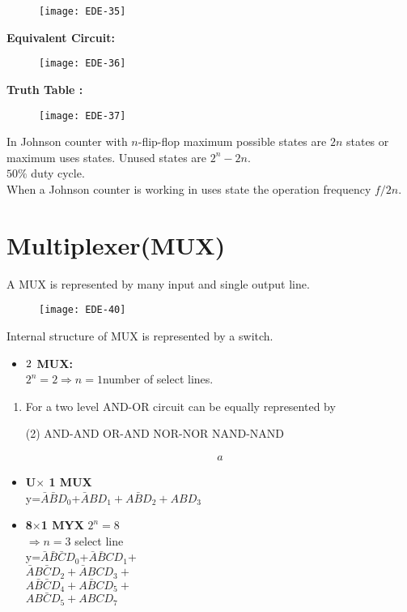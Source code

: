 \begin{enumerate}
\begin{figure}[H]
	\centering
	\texttt{[image: EDE-35]}
\end{figure}
\textbf { Equivalent Circuit: }
\begin{figure}[H]
	\centering
	\texttt{[image: EDE-36]}
\end{figure}
\textbf { Truth Table : }
\begin{figure}[H]
	\centering
	\texttt{[image: EDE-37]}
\end{figure}
In Johnson counter with $n$-flip-flop maximum possible states are $2 n$ states or maximum uses states. Unused states are $2^{n}-2 n$.\\
$50 \%$ duty cycle.\\
When a Johnson counter is working in uses state the operation frequency $f / 2 n$.\\
 \end{enumerate}
\section{Multiplexer(MUX)}
A MUX is represented by many input and single output line.
\begin{figure}[H]
	\centering
	\texttt{[image: EDE-40]}
\end{figure}
Internal structure of MUX is represented by a switch.
\begin{itemize}
\item 
\textbf{$2\time 1$ MUX:}\\
	$2^n=2\Rightarrow n=1$\quad number of select lines.\\
\end{itemize}
	\begin{enumerate}
	\item For a two level AND-OR circuit can be equally represented by
	 \begin{tasks}(2)
		\task[\textbf{a.}]AND-AND
		\task[\textbf{b.}]OR-AND
		\task[\textbf{c.}]NOR-NOR
		\task[\textbf{d.}] NAND-NAND
	\end{tasks}
\begin{answer}
	\begin{align*}
	a
	\end{align*}
\end{answer}

\end{enumerate}
\begin{itemize}
	\item \textbf{U$\times$ 1 MUX}\\
	y=$\bar{A}\bar{B}D_0$+$\bar{A}BD_1+A\bar{B}D_2+ABD_3$
	\item \textbf{8$\times $1 MYX}
$	2^n=8$\\
$\Rightarrow n=3$ select line\\
y=$\bar{A}\bar{B} \bar{C}D_0$+$\bar{A}\bar{B} CD_1$+\\
$\bar{A}B\bar{C}D_2+\bar{A}BCD_3+$\\
$A \bar{B}\bar{C}D_4+A\bar{B}CD_5+$\\
$AB\bar{C}D_5+ABCD_7$
\end{itemize}
